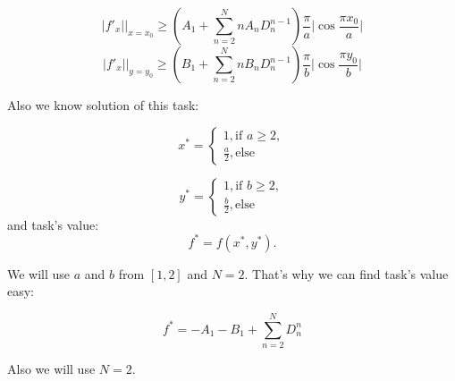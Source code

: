 \documentclass[12pt]{article}
\begin{document}
$$|f'_x|\Big|_{x = x_0} \geq \left(A_1 + \sum\limits_{n=2}^N n A_n D_n^{n-1}\right)\frac{\pi}{a}\Big|\cos \frac{\pi x_0}{a}\Big|$$
$$|f'_x|\Big|_{y = y_0} \geq \left(B_1 + \sum\limits_{n=2}^N n B_n D_n^{n-1}\right)\frac{\pi}{b}\Big|\cos \frac{\pi y_0}{b}\Big|$$

Also we know solution of this task:

\begin{equation}
x^* = \begin{cases}
1, \text{if $a \geq 2$},\\
\frac{a}{2}, \text{else}
\end{cases}
\end{equation}

\begin{equation}
y^* = \begin{cases}
1, \text{if $b \geq 2$},\\
\frac{b}{2}, \text{else}
\end{cases}
\end{equation}
and task's value:
$$f^* = f(x^*, y^*).$$

We will use $a$ and $b$ from $[1, 2]$ and $N = 2$. That's why we can find task's value easy:

$$f^* = -A_1 - B_1 + \sum\limits_{n=2}^ND_n^n$$

Also we will use $N = 2$.
\end{document}
